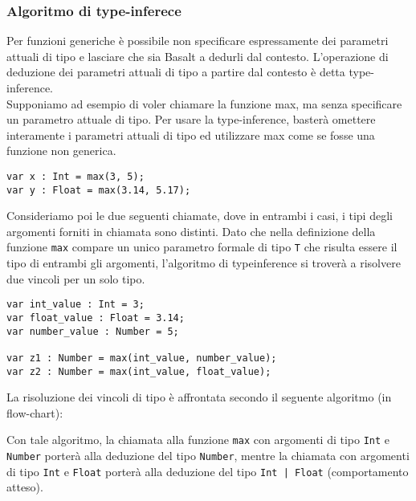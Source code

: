 \subsubsection{Algoritmo di type-inferece}
Per funzioni generiche è possibile non specificare espressamente dei parametri 
attuali di tipo e lasciare che sia Basalt a dedurli dal contesto. 
L’operazione di deduzione dei parametri attuali di tipo a partire dal 
contesto è detta type-inference. \\

Supponiamo ad esempio di voler chiamare la funzione max, ma 
senza specificare un parametro attuale di tipo. 
Per usare la type-inference, basterà omettere interamente i parametri attuali di 
tipo ed utilizzare max come se fosse una funzione non generica. \\

\vspace{0.5cm}
\begin{lstlisting}[frame=single]
var x : Int = max(3, 5);
var y : Float = max(3.14, 5.17);
\end{lstlisting}
\vspace{0.5cm}

Consideriamo poi le due seguenti chiamate, dove in entrambi i casi, 
i tipi degli argomenti forniti in chiamata sono distinti. Dato che nella definizione della 
funzione \texttt{max} compare un unico parametro formale di tipo \texttt{T} che risulta essere 
il tipo di entrambi gli argomenti, l'algoritmo di typeinference si troverà a risolvere due vincoli
per un solo tipo.\\

\vspace{0.5cm}
\begin{lstlisting}[frame=single]
var int_value : Int = 3;
var float_value : Float = 3.14;
var number_value : Number = 5;

var z1 : Number = max(int_value, number_value);
var z2 : Number = max(int_value, float_value);
\end{lstlisting}
\vspace{0.5cm}
 
La risoluzione dei vincoli di tipo è affrontata secondo il seguente algoritmo (in flow-chart):


\vspace{0.5cm}

Con tale algoritmo, la chiamata alla funzione \texttt{max} con argomenti di tipo \texttt{Int} e \texttt{Number}
porterà alla deduzione del tipo \texttt{Number}, mentre la chiamata con argomenti di tipo \texttt{Int} 
e \texttt{Float} porterà alla deduzione del tipo \texttt{Int | Float} (comportamento atteso).\\

